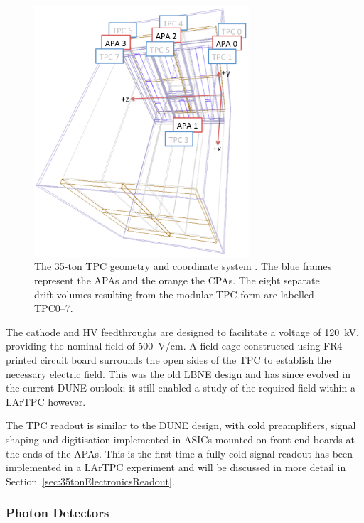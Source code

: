 \begin{figure}
  \centering
  \includegraphics[width=8cm]{35tonGeometry.png}
  \caption[The 35-ton TPC geometry.]{The 35-ton TPC geometry and coordinate system \cite{35tonGeometryAlion2014}.  The blue frames represent the APAs and the orange the CPAs.  The eight separate drift volumes resulting from the modular TPC form are labelled TPC0--7.}
  \label{fig:35tonGeometry}
\end{figure}

The cathode and HV feedthroughs are designed to facilitate a voltage of 120~kV, providing the nominal field of 500~V/cm.  A field cage constructed using FR4 printed circuit board surrounds the open sides of the TPC to establish the necessary electric field.  This was the old LBNE design and has since evolved in the current DUNE outlook; it still enabled a study of the required field within a LArTPC however.

The TPC readout is similar to the DUNE design, with cold preamplifiers, signal shaping and digitisation implemented in ASICs mounted on front end boards at the ends of the APAs.  This is the first time a fully cold signal readout has been implemented in a LArTPC experiment and will be discussed in more detail in Section~\ref{sec:35tonElectronicsReadout}.

\subsubsection{Photon Detectors}\label{sec:35tonPhotonDetectors}

